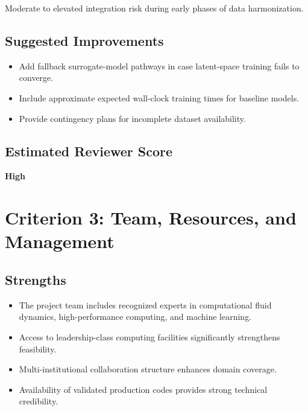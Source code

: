 \documentclass[11pt]{article}
\begin{document}
Moderate to elevated integration risk during early phases of data harmonization.

\subsection*{Suggested Improvements}

\begin{itemize}[leftmargin=1.5em]

\item Add fallback surrogate-model pathways in case latent-space training fails to converge.

\item Include approximate expected wall-clock training times for baseline models.

\item Provide contingency plans for incomplete dataset availability.

\end{itemize}

\subsection*{Estimated Reviewer Score}

\textbf{High}

\section*{Criterion 3: Team, Resources, and Management}

\subsection*{Strengths}

\begin{itemize}[leftmargin=1.5em]

\item The project team includes recognized experts in computational fluid dynamics, high-performance computing, and machine learning.

\item Access to leadership-class computing facilities significantly strengthens feasibility.

\item Multi-institutional collaboration structure enhances domain coverage.

\item Availability of validated production codes provides strong technical credibility.

\end{itemize}
\end{document}

